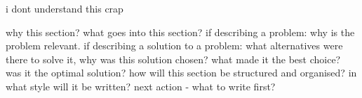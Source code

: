 

% 

i dont understand this crap


why this section? 
what goes into this section?
  if describing a problem: why is the problem relevant.
  if describing a solution to a problem: what alternatives were
  there to solve it, why was this solution chosen? what made it the best
  choice? was it the optimal solution?
how will this section be structured and organised?
in what style will it be written?
next action - what to write first?




